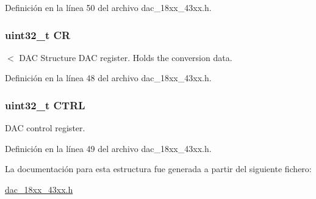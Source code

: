 Definición en la línea 50 del archivo dac\+\_\+18xx\+\_\+43xx.\+h.

\subsubsection[{\texorpdfstring{CR}{CR}}]{ uint32\+\_\+t CR}\hypertarget{struct_l_p_c___d_a_c___t_ab40c89c59391aaa9d9a8ec011dd0907a}{}\label{struct_l_p_c___d_a_c___t_ab40c89c59391aaa9d9a8ec011dd0907a}
$<$ D\+AC Structure D\+AC register. Holds the conversion data. 

Definición en la línea 48 del archivo dac\+\_\+18xx\+\_\+43xx.\+h.

\subsubsection[{\texorpdfstring{C\+T\+RL}{CTRL}}]{ uint32\+\_\+t C\+T\+RL}\hypertarget{struct_l_p_c___d_a_c___t_a15fc8d35f045f329b80c544bef35ff64}{}\label{struct_l_p_c___d_a_c___t_a15fc8d35f045f329b80c544bef35ff64}
D\+AC control register. 

Definición en la línea 49 del archivo dac\+\_\+18xx\+\_\+43xx.\+h.



La documentación para esta estructura fue generada a partir del siguiente fichero\+:\begin{DoxyCompactItemize}
\item 
\hyperlink{dac__18xx__43xx_8h}{dac\+\_\+18xx\+\_\+43xx.\+h}\end{DoxyCompactItemize}
